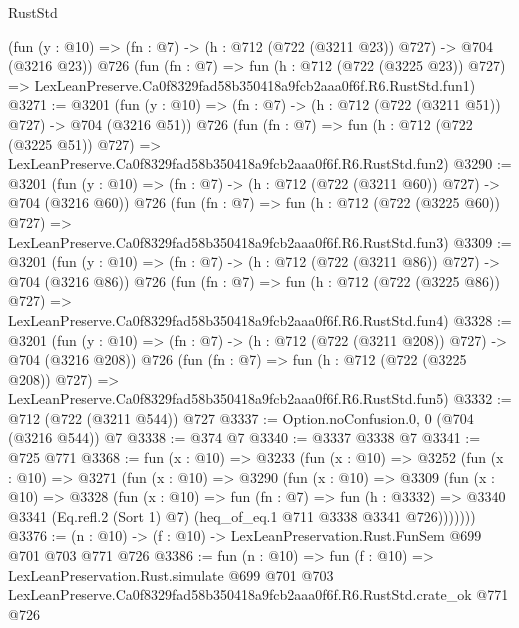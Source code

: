 \begin{lexlean}{RustStd}
\begin{coremodule}
    (fun (y : @10) => (fn : @7) -> (h : @712 (@722 (@3211 @23)) @727) -> @704 (@3216 @23))
    @726
    (fun (fn : @7) =>
    fun (h : @712 (@722 (@3225 @23)) @727) =>
    LexLeanPreserve.Ca0f8329fad58b350418a9fcb2aaa0f6f.R6.RustStd.fun1)
@3271 := @3201
    (fun (y : @10) => (fn : @7) -> (h : @712 (@722 (@3211 @51)) @727) -> @704 (@3216 @51))
    @726
    (fun (fn : @7) =>
    fun (h : @712 (@722 (@3225 @51)) @727) =>
    LexLeanPreserve.Ca0f8329fad58b350418a9fcb2aaa0f6f.R6.RustStd.fun2)
@3290 := @3201
    (fun (y : @10) => (fn : @7) -> (h : @712 (@722 (@3211 @60)) @727) -> @704 (@3216 @60))
    @726
    (fun (fn : @7) =>
    fun (h : @712 (@722 (@3225 @60)) @727) =>
    LexLeanPreserve.Ca0f8329fad58b350418a9fcb2aaa0f6f.R6.RustStd.fun3)
@3309 := @3201
    (fun (y : @10) => (fn : @7) -> (h : @712 (@722 (@3211 @86)) @727) -> @704 (@3216 @86))
    @726
    (fun (fn : @7) =>
    fun (h : @712 (@722 (@3225 @86)) @727) =>
    LexLeanPreserve.Ca0f8329fad58b350418a9fcb2aaa0f6f.R6.RustStd.fun4)
@3328 := @3201
    (fun (y : @10) => (fn : @7) -> (h : @712 (@722 (@3211 @208)) @727) -> @704 (@3216 @208))
    @726
    (fun (fn : @7) =>
    fun (h : @712 (@722 (@3225 @208)) @727) =>
    LexLeanPreserve.Ca0f8329fad58b350418a9fcb2aaa0f6f.R6.RustStd.fun5)
@3332 := @712 (@722 (@3211 @544)) @727
@3337 := Option.noConfusion.{0, 0} (@704 (@3216 @544)) @7
@3338 := @374 @7
@3340 := @3337 @3338 @7
@3341 := @725 @771
@3368 := fun (x : @10) =>
  @3233
    (fun (x : @10) =>
    @3252
      (fun (x : @10) =>
      @3271
        (fun (x : @10) =>
        @3290
          (fun (x : @10) =>
          @3309
            (fun (x : @10) =>
            @3328
              (fun (x : @10) =>
              fun (fn : @7) =>
              fun (h : @3332) =>
              @3340 @3341 (Eq.refl.{2} (Sort 1) @7) (heq_of_eq.{1} @711 @3338 @3341 @726)))))))
@3376 := (n : @10) -> (f : @10) -> LexLeanPreservation.Rust.FunSem @699 @701 @703 @771 @726
@3386 := fun (n : @10) =>
  fun (f : @10) =>
  LexLeanPreservation.Rust.simulate
    @699
    @701
    @703
    LexLeanPreserve.Ca0f8329fad58b350418a9fcb2aaa0f6f.R6.RustStd.crate_ok
    @771
    @726
\end{coremodule}
\end{lexlean}
